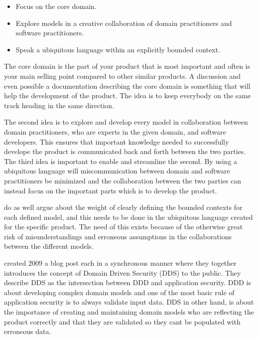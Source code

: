 \begin{itemize}
  \item Focus on the core domain.
  \item Explore models in a creative collaboration of domain practitioners and software practitioners.
  \item Speak a ubiquitous language within an explicitly bounded context.
\end{itemize}

The core domain is the part of your product that is most important and often is your main selling point compared to other similar products. \parencite{millett_2015} A discussion and even possible a documentation describing the core domain is something that will help the development of the product. The idea is to keep everybody on the same track heading in the same direction. \parencite{EvansEric2004Dd:t}

The second idea is to explore and develop every model in collaboration between domain practitioners, who are experts in the given domain, and software developers. This ensures that important knowledge needed to successfully develope the product is communicated back and forth between the two parties. \parencite{millett_2015} The third idea is important to enable and streamline the second. By using a ubiquitous language will miscommunication between domain and software practitioners be minimized and the collaboration between the two parties can instead focus on the important parts which is to develop the product. \parencite{evans_2015}

\textcite{evans_2015} do as well argue about the weight of clearly defining the bounded contexts for each defined model, and this needs to be done in the ubiquitous language created for the specific product. The need of this exists because of the otherwise great risk of misunderstandings and erroneous assumptions in the collaborations between the different models. \parencite{millett_2015}

\textcite{Wilander2009, Johnsson2009} created 2009 a blog post each in a synchronous manner where they together introduces the concept of Domain Driven Security (DDS) to the public. They describe DDS as the intersection between DDD and application security. DDD is about developing complex domain models and one of the most basic rule of application security is to always validate input data. DDS in other hand, is about the importance of creating and maintaining domain models who are reflecting the product correctly and that they are validated so they cant be populated with erroneous data. \parencite{Wilander2009, Johnsson2009, Arnor2016, Stendahl2016}


